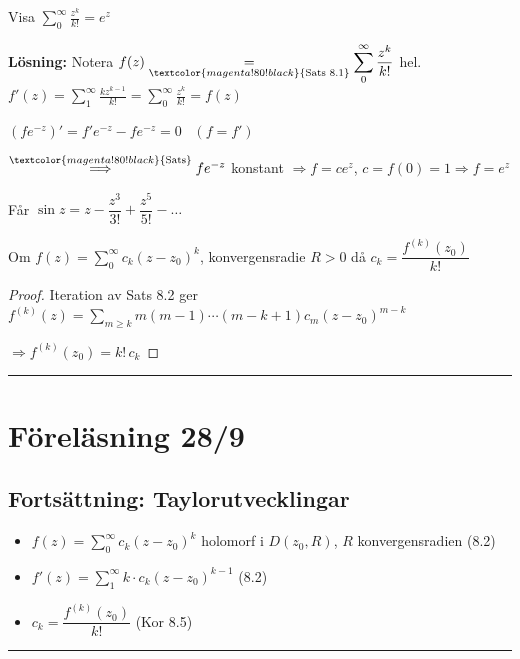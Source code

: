 \begin{example}
Visa $\displaystyle\sum_0^\infty \frac{z^k}{k!} = e^z$

\textbf{Lösning:} Notera $f(z) \underset{\textcolor{magenta!80!black}{\text{Sats 8.1}}}{=} \displaystyle\sum_0^\infty \frac{z^k}{k!}$ hel. \quad $f'(z) = \displaystyle\sum_1^\infty \frac{kz^{k-1}}{k!} = \sum_0^\infty \frac{z^k}{k!} = f(z)$

$(fe^{-z})' = f'e^{-z} - fe^{-z} = 0$ \ \textcolor{magenta!80!black}{$(f = f')$}

$\overset{\textcolor{magenta!80!black}{\text{Sats}}}{\Longrightarrow} fe^{-z}$ konstant $\Rightarrow f = ce^z$, $c = f(0) = 1 \Longrightarrow f = e^z$

Får $\sin z = z - \dfrac{z^3}{3!} + \dfrac{z^5}{5!} - \dots$
\end{example}

\begin{theorem}[Kor 8.5]
Om $f(z) = \sum_0^\infty c_k(z - z_0)^k$, konvergensradie $R > 0$ då $c_k = \dfrac{f^{(k)}(z_0)}{k!}$
\end{theorem}
\begin{proof}
Iteration av Sats 8.2 ger $f^{(k)}(z) = \displaystyle\sum_{m \ge k} m(m - 1) \cdots (m - k + 1)c_m(z - z_0)^{m-k}$

$\Rightarrow f^{(k)}(z_0) = k!\,c_k$
\end{proof}

\noindent\rule{\linewidth}{0.4pt}

\section{Föreläsning 28/9}
\subsection{Fortsättning: Taylorutvecklingar}
\begin{itemize}
  \item $f(z) = \sum_0^\infty c_k(z - z_0)^k$ holomorf i $D(z_0, R)$, $R$ konvergensradien \textcolor{blue!60!black}{(8.2)}
  \item $f'(z) = \sum_1^\infty k \cdot c_k(z - z_0)^{k-1}$ \quad \textcolor{blue!60!black}{(8.2)}
  \item $c_k = \dfrac{f^{(k)}(z_0)}{k!}$ \quad \textcolor{blue!60!black}{(Kor 8.5)}
\end{itemize}

\noindent\rule{\linewidth}{0.4pt}

